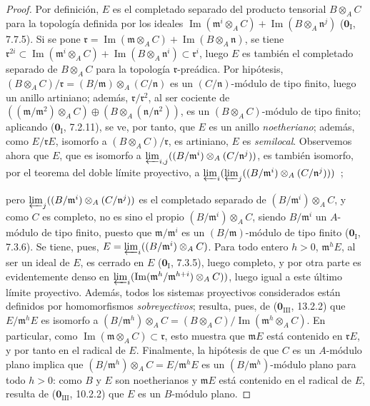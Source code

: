 \begin{proof}
Por definición, $E$ es el completado separado del producto tensorial $B\otimes_A C$
para la topología definida por los ideales
$\operatorname{Im}(\mathfrak m^i\otimes_A C)+
\operatorname{Im}(B\otimes_A\mathfrak n^j)$
($\mathbf 0_{\mathrm I}$, 7.7.5). Si se pone
$\mathfrak r=\operatorname{Im}(\mathfrak m\otimes_A C)+
\operatorname{Im}(B\otimes_A\mathfrak n)$,
se tiene
$\mathfrak r^{2i}\subset
\operatorname{Im}(\mathfrak m^i\otimes_A C)+
\operatorname{Im}(B\otimes_A\mathfrak n^i)\subset\mathfrak r^i$, luego $E$
es también el completado separado de $B\otimes_A C$ para la topología
$\mathfrak r$-preádica. Por hipótesis,
$(B\otimes_A C)/\mathfrak r=(B/\mathfrak m)\otimes_A(C/\mathfrak n)$ es un
$(C/\mathfrak n)$-módulo de tipo finito, luego un anillo artiniano; además,
$\mathfrak r/\mathfrak r^2$, al ser cociente de
$((\mathfrak m/\mathfrak m^2)\otimes_A C)
\oplus(B\otimes_A(\mathfrak n/\mathfrak n^2))$,
es un $(B\otimes_A C)$-módulo de tipo finito; aplicando
($\mathbf 0_{\mathrm I}$, 7.2.11), se ve, por tanto, que $E$ es un anillo
\emph{noetheriano}; además, como $E/\mathfrak rE$, isomorfo a
$(B\otimes_A C)/\mathfrak r$, es artiniano, $E$ es \emph{semilocal}.
Observemos ahora que $E$, que es isomorfo a
$\varprojlim_{i,j}((B/\mathfrak m^i)\otimes_A(C/\mathfrak n^j))$,
es también isomorfo, por el teorema del doble límite proyectivo, a
$\varprojlim_i(\varprojlim_j
  ((B/\mathfrak m^i)\otimes_A(C/\mathfrak n^j)))$~;



pero $\varprojlim_j((B/\mathfrak m^i)\otimes_A(C/\mathfrak n^j))$
 es el
completado separado de $(B/\mathfrak m^i)\otimes_A C$, y como $C$ es completo,
no es sino el propio $(B/\mathfrak m^i)\otimes_A C$,
siendo $B/\mathfrak m^i$ un $A$-módulo de tipo finito, puesto que
$\mathfrak m/\mathfrak m^i$ es un $(B/\mathfrak m)$-módulo de tipo finito
($\mathbf 0_{\mathrm I}$, 7.3.6). Se tiene, pues,
$E=\varprojlim_i((B/\mathfrak m^i)\otimes_A C)$.
Para todo entero $h>0$, $\mathfrak m^hE$, al ser un ideal de $E$, es cerrado
en $E$ ($\mathbf 0_{\mathrm I}$, 7.3.5), luego completo, y por otra parte es
evidentemente denso en
$\varprojlim_i(\operatorname{Im}(\mathfrak m^h/\mathfrak m^{h+i})\otimes_A C))$,
luego igual a este último límite proyectivo. Además, todos los sistemas
proyectivos considerados están definidos por homomorfismos \emph{sobreyectivos};
resulta, pues, de ($\mathbf 0_{\mathrm{III}}$, 13.2.2) que
$E/\mathfrak m^hE$ es isomorfo a
$(B/\mathfrak m^h)\otimes_A C=(B\otimes_A C)/\operatorname{Im}(\mathfrak m^h\otimes_A C)$.
En particular, como
$\operatorname{Im}(\mathfrak m\otimes_A C)\subset\mathfrak r$, esto muestra
que $\mathfrak mE$ está contenido en $\mathfrak rE$, y por tanto en el radical de
$E$. Finalmente, la hipótesis de que $C$ es un $A$-módulo plano implica que
$(B/\mathfrak m^h)\otimes_A C=E/\mathfrak m^hE$ es un
$(B/\mathfrak m^h)$-módulo plano para todo $h>0$: como $B$ y $E$ son
noetherianos y $\mathfrak mE$ está contenido en el radical de $E$,
resulta de ($\mathbf 0_{\mathrm{III}}$, 10.2.2) que $E$ es un $B$-módulo
plano.
\end{proof}

